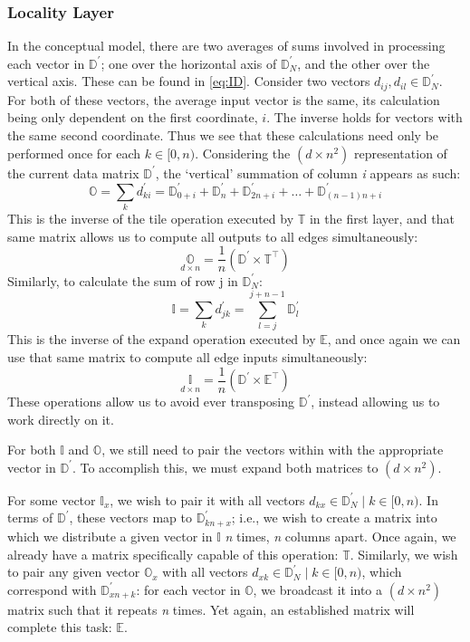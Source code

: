 \subsubsection{Locality Layer}
\label{subsubsec:matconvlayer}
In the conceptual model, there are two averages of sums involved in processing 
each vector in $\mathbb{D}^\prime$; one over the horizontal axis of 
$\mathbb{D}^\prime_N$, and the other over the vertical axis. These can be found 
in \eqref{eq:ID}. Consider two vectors $d_{ij}, d_{il} \in \mathbb{D}^\prime_N$.  
For both of these vectors, the average input vector is the same, its calculation 
being only dependent on the first coordinate, $i$. The inverse holds for vectors 
with the same second coordinate. Thus we see that these calculations need only 
be performed once for each $k \in [0,n)$. Considering the $(d \times n^2)$ 
representation of the current data matrix $\mathbb{D}^\prime$, the `vertical' 
summation of column \textit{i} appears as such:
\[
	\mathbb{O} = \sum_k d^\prime_{ki} = \mathbb{D}^\prime_{0+i} + 
	\mathbb{D}^\prime_n + \mathbb{D}^\prime_{2n + i} + \dots + 
	\mathbb{D}^\prime_{(n-1)n + i}
\]
This is the inverse of the tile operation executed by $\mathbb{T}$ in the first 
layer, and that same matrix allows us to compute all outputs to all edges 
simultaneously:
\[
	\underset{d \times n}{\mathbb{O}} = \frac{1}{n} \left(\mathbb{D}^\prime 
	\times \mathbb{T}^\top\right)
\]
Similarly, to calculate the sum of row j in $\mathbb{D}^\prime_N$:
\[
	\mathbb{I} = \sum_k d^\prime_{jk} = \sum_{l=j}^{j + n-1} \mathbb{D}^\prime_l
\]
This is the inverse of the expand operation executed by $\mathbb{E}$, and once 
again we can use that same matrix to compute all edge inputs simultaneously:
\[
	\underset{d \times n}{\mathbb{I}} = \frac{1}{n}\left(\mathbb{D}^\prime 
	\times \mathbb{E}^\top \right)
\]
These operations allow us to avoid ever transposing $\mathbb{D}^\prime$, instead 
allowing us to work directly on it.

For both $\mathbb{I}$ and $\mathbb{O}$, we still need to pair the vectors within 
with the appropriate vector in $\mathbb{D}^\prime$. To accomplish this, we must 
expand both matrices to $(d \times n^2)$. 

For some vector $\mathbb{I}_x$, we wish to pair it with all vectors $d_{kx} \in 
\mathbb{D}^\prime_N \mid k \in [0,n)$. In terms of $\mathbb{D}^\prime$, these 
vectors map to $\mathbb{D}^\prime_{kn+x}$; i.e., we wish to create a matrix into 
which we distribute a given vector in $\mathbb{I}$ \textit{n} times, \textit{n} 
columns apart. Once again, we already have a matrix specifically capable of this 
operation: $\mathbb{T}$.  Similarly, we wish to pair any given vector 
$\mathbb{O}_x$ with all vectors ${d_{xk} \in \mathbb{D}^\prime_N \mid k \in 
[0,n)}$, which correspond with $\mathbb{D}^\prime_{xn + k}$: for each vector in 
$\mathbb{O}$, we broadcast it into a $(d \times n^2)$ matrix such that it 
repeats \textit{n} times. Yet again, an established matrix will complete this 
task: $\mathbb{E}$.

